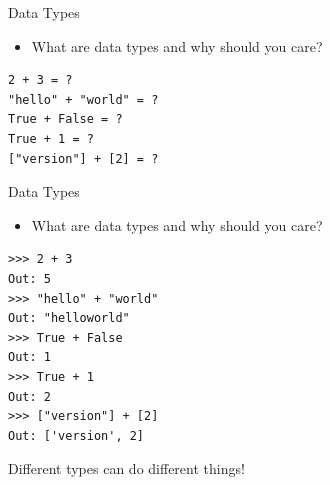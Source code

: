 \documentclass[compress%
,aspectratio=169%
]{beamer}
\begin{document}
\begin{frame}[fragile]{Data Types}

    \begin{itemize}
        \item What are data types and why should you care?
    \end{itemize}
\begin{lstlisting}[language=iPython]
2 + 3 = ?
"hello" + "world" = ?
True + False = ?
True + 1 = ?
["version"] + [2] = ?
\end{lstlisting}
    
\end{frame}

\begin{frame}[fragile]{Data Types}

    \begin{itemize}
        \item What are data types and why should you care?
    \end{itemize}
\begin{lstlisting}
>>> 2 + 3
Out: 5
>>> "hello" + "world"
Out: "helloworld"
>>> True + False
Out: 1
>>> True + 1
Out: 2
>>> ["version"] + [2]
Out: ['version', 2]
\end{lstlisting}
Different types can do different things!
\end{frame}
\end{document}
